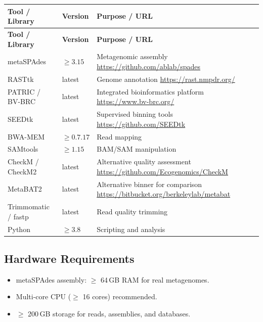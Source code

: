 \documentclass[11pt,a4paper]{article}
\begin{document}
\begin{longtable}{p{4.5cm} p{2.5cm} p{6.5cm}}
\toprule
\textbf{Tool / Library} & \textbf{Version} & \textbf{Purpose / URL} \\
\midrule
\endfirsthead
\toprule
\textbf{Tool / Library} & \textbf{Version} & \textbf{Purpose / URL} \\
\midrule
\endhead
metaSPAdes & $\geq 3.15$ & Metagenomic assembly \newline \url{https://github.com/ablab/spades} \\
\midrule
RASTtk & latest & Genome annotation \newline \url{https://rast.nmpdr.org/} \\
\midrule
PATRIC / BV-BRC & latest & Integrated bioinformatics platform \newline \url{https://www.bv-brc.org/} \\
\midrule
SEEDtk & latest & Supervised binning tools \newline \url{https://github.com/SEEDtk} \\
\midrule
BWA-MEM & $\geq 0.7.17$ & Read mapping \\
\midrule
SAMtools & $\geq 1.15$ & BAM/SAM manipulation \\
\midrule
CheckM / CheckM2 & latest & Alternative quality assessment \newline \url{https://github.com/Ecogenomics/CheckM} \\
\midrule
MetaBAT2 & latest & Alternative binner for comparison \newline \url{https://bitbucket.org/berkeleylab/metabat} \\
\midrule
Trimmomatic / fastp & latest & Read quality trimming \\
\midrule
Python & $\geq 3.8$ & Scripting and analysis \\
\bottomrule
\end{longtable}

\subsection{Hardware Requirements}
\begin{itemize}
  \item metaSPAdes assembly: $\geq$ 64\,GB RAM for real metagenomes.
  \item Multi-core CPU ($\geq$ 16 cores) recommended.
  \item $\geq$ 200\,GB storage for reads, assemblies, and databases.
\end{itemize}
\end{document}
